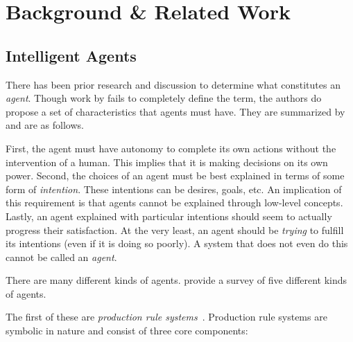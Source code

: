 \chapter{Background \& Related Work}
\label{ch:background}

%
%
%

\section{Intelligent Agents}
\label{sec:agents}

There has been prior research and discussion to determine what constitutes an \textit{agent}.
Though work by \citet{wooldridge_agent_1995} fails to completely define the term,
the authors do propose a set of characteristics that agents must have.
They are summarized by \citet{dignum_intentional_1998} and are as follows.

First, the agent must have autonomy to complete its own actions without the intervention of a human.
This implies that it is making decisions on its own power.
Second, the choices of an agent must be best explained in terms of some form of \textit{intention}.
These intentions can be desires, goals, etc.
An implication of this requirement is that agents cannot be explained through low-level concepts.
Lastly, an agent explained with particular intentions should seem to actually progress their satisfaction.
At the very least, an agent should be \textit{trying} to fulfill its intentions (even if it is doing so poorly).
A system that does not even do this cannot be called an \textit{agent}.

There are many different kinds of agents.
\citet{balke_how_2014} provide a survey of five different kinds of agents.

The first of these are \textit{production rule systems}~\citep{balke_how_2014}.
Production rule systems are symbolic in nature and
consist of three core components:

